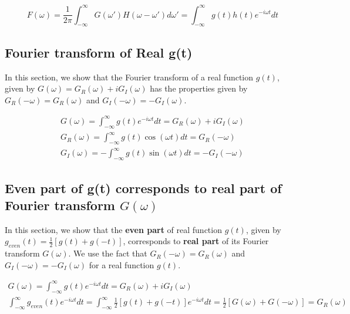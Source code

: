 \documentclass[11pt]{elsarticle}
\begin{document}
\begin{equation} \label{sec_C_1_eq_2}   
F(\omega) = \frac{1}{2 \pi}  \int_{-\infty}^{\infty} G(\omega') H(\omega - \omega') d\omega' = \int_{-\infty}^{\infty} g(t) h(t) e^{-i\omega t} dt
\end{equation}




\subsection{\label{sec:appendix_I_2} \textbf{Fourier transform of Real g(t)} \protect\\  \lowercase{} }


In this section, we show that the Fourier transform of a real function $g(t)$, given by $G(\omega) =  G_R(\omega) + i G_I(\omega)$ has the properties given by $ G_R(-\omega) = G_R(\omega) $ and  $ G_I(-\omega) = -G_I(\omega)$.

\begin{eqnarray*}\label{sec_C_2_eq_1}   
G(\omega)=  \int_{-\infty}^{\infty} g(t) e^{-i \omega t} dt = G_R(\omega) + i G_I(\omega)\\
G_R(\omega)=  \int_{-\infty}^{\infty} g(t) \cos{(\omega t) } dt = G_R(-\omega) \\
G_I(\omega)=  - \int_{-\infty}^{\infty} g(t) \sin{(\omega t) } dt = - G_I(-\omega) 
\end{eqnarray*}
\begin{equation} \end{equation}


\subsection{\label{sec:appendix_I_3} \textbf{Even part of g(t) corresponds to real part of Fourier transform $G(\omega)$} \protect\\  \lowercase{} }


In this section, we show that the \textbf{even part} of real function $g(t)$, given by $g_{even}(t)=\frac{1}{2} [g(t)+g(-t) ] $, corresponds to \textbf{real part} of its Fourier transform $G(\omega)$. We use the fact that $ G_R(-\omega) = G_R(\omega) $ and  $ G_I(-\omega) = -G_I(\omega) $ for a real function $g(t)$.


\begin{eqnarray*}\label{sec_C_3_eq_1}   
G(\omega)=  \int_{-\infty}^{\infty} g(t) e^{-i \omega t} dt = G_R(\omega) + i G_I(\omega)\\
 \int_{-\infty}^{\infty} g_{even}(t) e^{-i \omega t} dt = \int_{-\infty}^{\infty} \frac{1}{2} [g(t)+g(-t) ] e^{-i\omega t} dt =\frac{1}{2}  [ G(\omega) + G(-\omega)  ] = G_R(\omega) 
\end{eqnarray*}
\begin{equation} \end{equation}
\end{document}
